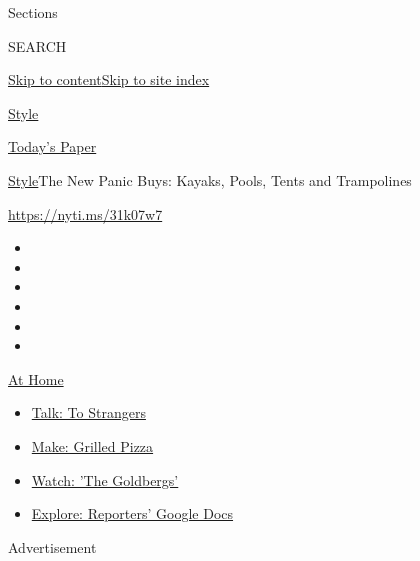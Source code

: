 Sections

SEARCH

\protect\hyperlink{site-content}{Skip to
content}\protect\hyperlink{site-index}{Skip to site index}

\href{https://www.nytimes.com/section/style}{Style}

\href{https://myaccount.nytimes.com/auth/login?response_type=cookie\&client_id=vi}{}

\href{https://www.nytimes.com/section/todayspaper}{Today's Paper}

\href{/section/style}{Style}\textbar{}The New Panic Buys: Kayaks, Pools,
Tents and Trampolines

\url{https://nyti.ms/31k07w7}

\begin{itemize}
\item
\item
\item
\item
\item
\item
\end{itemize}

\href{https://www.nytimes.com/spotlight/at-home?action=click\&pgtype=Article\&state=default\&region=TOP_BANNER\&context=at_home_menu}{At
Home}

\begin{itemize}
\tightlist
\item
  \href{https://www.nytimes.com/2020/08/03/well/family/the-benefits-of-talking-to-strangers.html?action=click\&pgtype=Article\&state=default\&region=TOP_BANNER\&context=at_home_menu}{Talk:
  To Strangers}
\item
  \href{https://www.nytimes.com/2020/08/01/at-home/coronavirus-make-pizza-on-a-grill.html?action=click\&pgtype=Article\&state=default\&region=TOP_BANNER\&context=at_home_menu}{Make:
  Grilled Pizza}
\item
  \href{https://www.nytimes.com/2020/07/31/arts/television/goldbergs-abc-stream.html?action=click\&pgtype=Article\&state=default\&region=TOP_BANNER\&context=at_home_menu}{Watch:
  'The Goldbergs'}
\item
  \href{https://www.nytimes.com/interactive/2020/at-home/even-more-reporters-editors-diaries-lists-recommendations.html?action=click\&pgtype=Article\&state=default\&region=TOP_BANNER\&context=at_home_menu}{Explore:
  Reporters' Google Docs}
\end{itemize}

Advertisement

